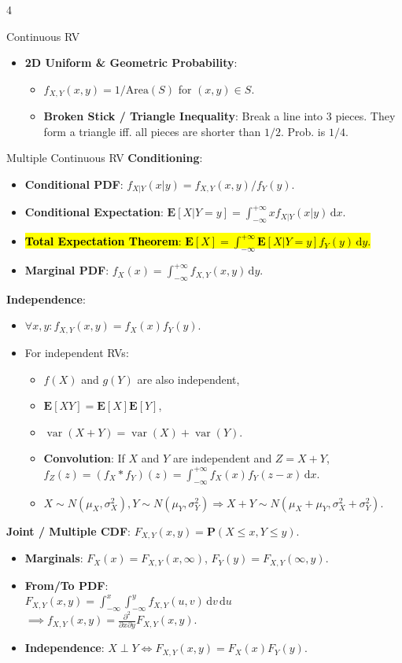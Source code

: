 \documentclass[landscape,a4paper]{article}
\renewcommand{\emph}[1]{\hl{#1}}
\newcommand{\PP}{\mathbf{P}}
\newcommand{\EE}{\mathbf{E}}
\newcommand{\var}{\operatorname{var}}
\begin{document}
\begin{multicols*}{4}
\begin{card}{Continuous RV}
\begin{itemize}
				\item \textbf{2D Uniform \& Geometric Probability}:
				\begin{itemize}
					\item $f_{X,Y}(x,y) = 1/\text{Area}(S)$ for $(x,y) \in S$.
					\item \textbf{Broken Stick / Triangle Inequality}: Break a line into 3 pieces. They form a triangle iff. all pieces are shorter than $1/2$. Prob. is $1/4$.
				\end{itemize}
			\end{itemize}
		\end{card}
		\begin{card}{Multiple Continuous RV}
			\textbf{Conditioning}:
			\begin{itemize}
				\item \textbf{Conditional PDF}: $f_{X|Y}(x|y)=f_{X,Y}(x,y)/f_{Y}(y)$.
				\item \textbf{Conditional Expectation}: $\EE[X|Y=y]=\int_{-\infty}^{+\infty}xf_{X|Y}(x|y)\,\mathrm dx$.
				\item \emph{\textbf{Total Expectation Theorem}: $\EE[X]=\int_{-\infty}^{+\infty}\EE[X|Y=y]f_Y(y)\,\mathrm dy$.}
				\item \textbf{Marginal PDF}: $f_X(x)=\int_{-\infty}^{+\infty} f_{X,Y}(x,y)\,\mathrm dy$.
			\end{itemize}
			\textbf{Independence}:
			\begin{itemize}
				\item $\forall x,y\colon f_{X,Y}(x,y)=f_X(x)f_Y(y)$.
				\item For independent RVs:
				\begin{itemize}
					\item $f(X)$ and $g(Y)$ are also independent,
					\item $\EE[XY]=\EE[X]\EE[Y]$,
					\item $\var(X+Y)=\var(X)+\var(Y)$.
					\item \textbf{Convolution}: If $X$ and $Y$ are independent and $Z=X+Y$, $f_Z(z)=(f_X\ast f_Y)(z)=\int_{-\infty}^{+\infty}f_X(x)f_Y(z-x)\,\mathrm dx$.
					\item $X\sim N(\mu_X,\sigma_X^2),Y\sim N(\mu_Y,\sigma_Y^2)\Rightarrow X+Y\sim N(\mu_X+\mu_Y,\sigma_X^2+\sigma_Y^2)$.
				\end{itemize}
			\end{itemize}
			\textbf{Joint / Multiple CDF}: $F_{X,Y}(x,y) = \PP(X \le x, Y \le y)$.
			\begin{itemize}
				\item \textbf{Marginals}: $F_X(x) = F_{X,Y}(x, \infty)$, $F_Y(y) = F_{X,Y}(\infty, y)$.
				\item \textbf{From/To PDF}:\\$F_{X,Y}(x,y) = \int_{-\infty}^{x} \int_{-\infty}^{y} f_{X,Y}(u,v)\,\mathrm dv\,\mathrm du $\\$\implies f_{X,Y}(x,y) = \frac{\partial^2}{\partial x \partial y} F_{X,Y}(x,y)$.
				\item \textbf{Independence}: $X \perp Y \iff F_{X,Y}(x,y) = F_X(x)F_Y(y)$.
			\end{itemize}
			

\end{card}
\end{multicols*}
\end{document}
